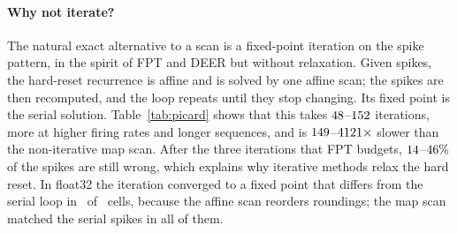 \documentclass[10pt]{article}
\theoremstyle{remark}
\begin{document}
\paragraph{Why not iterate?}
The natural exact alternative to a scan is a fixed-point iteration on the spike pattern, in the spirit of FPT and DEER but without relaxation. Given spikes, the hard-reset recurrence is affine and is solved by one affine scan; the spikes are then recomputed, and the loop repeats until they stop changing. Its fixed point is the serial solution. Table~\ref{tab:picard} shows that this takes $48$--$152$ iterations, more at higher firing rates and longer sequences, and is $149$--$4121\times$ slower than the non-iterative map scan. After the three iterations that FPT budgets, $14$--$46\%$ of the spikes are still wrong, which explains why iterative methods relax the hard reset. In float32 the iteration converged to a fixed point that differs from the serial loop in \PicInexact\ of \PicCells\ cells, because the affine scan reorders roundings; the map scan matched the serial spikes in all of them.

\begin{table}[t]
\centering\small

\caption{Exact fixed-point (Picard) iteration on the spike pattern vs.\ the map scan and the tuned serial kernel ($\beta=0.9$, RTX~5090). ``Error after 3'': fraction of wrong spikes after three iterations. $^*$: the float32 fixed point differs from the serial trajectory.}
\label{tab:picard}
\end{table}
\end{document}
